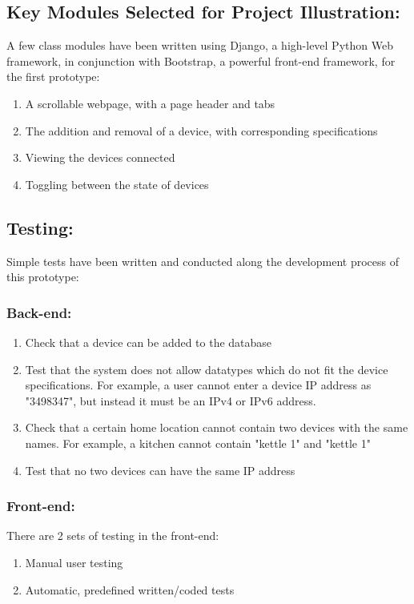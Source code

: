 \documentclass[11pt, a4paper]{article}
\begin{document}
	\subsection{Key Modules Selected for Project Illustration:}
	A few class modules have been written using Django, a high-level Python Web framework, in conjunction with Bootstrap, a powerful front-end framework, for the first prototype: 
	\begin{enumerate}
		\item A scrollable webpage, with a page header and tabs
		\item The addition and removal of a device, with corresponding specifications
		\item Viewing the devices connected
		\item Toggling between the state of devices
	\end{enumerate}
	
	\subsection{Testing:}
	Simple tests have been written and conducted along the development process of this prototype: 
	\subsubsection{Back-end:}
	\begin{enumerate}
		\item Check that a device can be added to the database
		\item Test that the system does not allow datatypes which do not fit the device specifications. For example, a user cannot enter a device IP address as "3498347", but instead it must be an IPv4 or IPv6 address. 
		\item Check that a certain home location cannot contain two devices with the same names. For example, a kitchen cannot contain "kettle 1" and "kettle 1" 
		\item Test that no two devices can have the same IP address
	\end{enumerate}
	\subsubsection{Front-end:}
	There are 2 sets of testing in the front-end: 
	\begin{enumerate}
		\item Manual user testing
		\item Automatic, predefined written/coded tests
	\end{enumerate}
	
\end{document}
